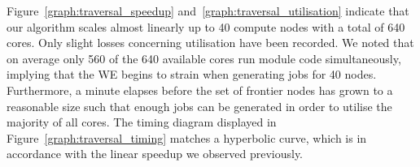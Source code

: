 Figure~\ref{graph:traversal_speedup} and~\ref{graph:traversal_utilisation} indicate that our algorithm scales almost linearly up to 40 compute nodes with a total of 640 cores. Only slight losses concerning utilisation have been recorded. We noted that on average only 560 of the 640 available cores run module code simultaneously, implying that the \ac{WE} begins to strain when generating jobs for 40 nodes. Furthermore, a minute elapses before the set of frontier nodes has grown to a reasonable size such that enough jobs can be generated in order to utilise the majority of all cores. The timing diagram displayed in Figure~\ref{graph:traversal_timing} matches a hyperbolic curve, which is in accordance with the linear speedup we observed previously.


